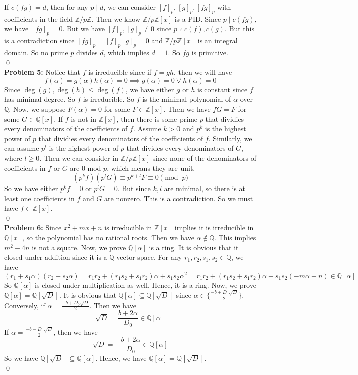 \documentclass[12pt]{amsart}
\newcommand{\Q}{\mathbb{Q}}
\newcommand{\Z}{\mathbb{Z}}
\begin{document}
If $c(fg)=d$, then for any $p\mid d$, we can consider $[f]_p,[g]_p,[fg]_p$ with coefficients in the field $\Z/p\Z$. Then we know $\Z/p\Z[x]$ is a PID. Since $p\mid c(fg)$, we have $[fg]_p=0$. But we have $[f]_p,[g]_p\neq 0$ since $p\nmid c(f),c(g)$. But this is a contradiction since $[fg]_p=[f]_p[g]_p=0$ and $\Z/p\Z[x]$ is an integral domain. So no prime $p$ divides $d$, which implies $d=1$. So $fg$ is primitive.\\ \qed\\
\textbf{Problem 5:} Notice that $f$ is irreducible since if $f=gh$, then we will have 
\[f(\alpha)=g(\alpha)h(\alpha)=0\implies g(\alpha)=0 \lor h(\alpha)=0 \]
Since $\deg (g),\deg (h)\leq \deg (f)$, we have either $g$ or $h$ is constant since $f$ has minimal degree. So $f$ is irreducible. So $f$ is the minimal polynomial of $\alpha$ over $\Q$. Now, we suppose $F(\alpha)=0$ for some $F\in \Z[x]$. Then we have $fG=F$ for some $G\in \Q[x]$. If $f$ is not in $\Z[x]$, then there is some prime $p$ that dividies every denominators of the coefficients of $f$. Assume $k>0$ and $p^k$ is the highest power of $p$ that dividies every denominators of the coefficients of $f$. Similarly, we can assume $p^l$ is the highest power of $p$ that divides every denominators of $G$, where $l\geq 0$. Then we can consider in $\Z/p\Z[x]$ since none of the denominators of coefficients in $f$ or $G$ are 0 mod $p$, which means they are unit.
\[(p^kf) (p^lG)\equiv p^{k+l}F\equiv 0\pmod p\]
So we have either $p^kf=0$ or $p^lG=0$. But since $k,l$ are minimal, so there is at least one coefficients in $f$ and $G$ are nonzero. This is a contradiction. So we must have $f\in\Z[x]$.\\ 
\qed\\
\textbf{Problem 6:} Since $x^2+mx+n$ is irreducible in $\Z[x]$ implies it is irreducible in $\Q[x]$, so the polynomial has no rational roots. Then we have $\alpha\notin\Q$. This implies $m^2-4n$ is not a square. Now, we prove $\Q[\alpha]$ is a ring. It is obvious that it closed under addition since it is a $\Q$-vector space. For any $r_1,r_2,s_1,s_2\in \Q$, we have 
\[(r_1+s_1\alpha)(r_2+s_2\alpha)=r_1r_2+(r_1s_2+s_1r_2)\alpha+s_1s_2\alpha^2=r_1r_2+(r_1s_2+s_1r_2)\alpha+s_1s_2(-m\alpha-n)\in \Q[\alpha]\] 
So $\Q[\alpha]$ is closed under multiplication as well. Hence, it is a ring. Now, we prove $\Q[\alpha]=\Q[\sqrt{D}]$. It is obvious that $\Q[\alpha]\subseteq \Q[\sqrt{D}]$ since $\alpha\in\{\frac{-b\pm D_0\sqrt{D}}{2}\}$.\\
Conversely, if $\alpha=\frac{-b+ D_0\sqrt{D}}{2}$. Then we have 
\[\sqrt{D}=\frac{b+2\alpha}{D_0}\in \Q[\alpha]\]
If $\alpha=\frac{-b- D_0\sqrt{D}}{2}$, then we have
\[\sqrt{D}=-\frac{b+2\alpha}{D_0}\in \Q[\alpha]\]
So we have $\Q[\sqrt{D}]\subseteq \Q[\alpha]$. Hence, we have $\Q[\alpha]=\Q[\sqrt{D}]$.\\ \qed\\
\end{document}
